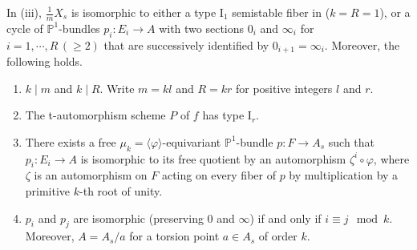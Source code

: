 \documentclass[reqno, letterpaper]{amsart}
\numberwithin{equation}{subsection}
\let\to\longrightarrow
\newcommand{\PP}{\mathbb{P}}
\begin{document}
		\begin{theorem}  \label{thm:classification of multiple fiber iii}
			In (iii), $\frac{1}{m}X_s$ is isomorphic to either a type $\mathrm I_1$ semistable fiber in  ($k = R = 1$), or a cycle of $\PP^1$-bundles $p_i : E_i \to A$ with two sections $0_i$ and $\infty_i$ for $i = 1, \cdots, R \, (\ge 2)$ that are successively identified by $0_{i+1} = \infty_i$. Moreover, the following holds.
			\begin{enumerate}
				\item $k \mid m$ and $k \mid R$. Write $m = kl$ and $R = kr$ for positive integers $l$ and $r$.
				\item The t-automorphism scheme $P$ of $f$ has type $\mathrm I_r$.
				\item There exists a free $\mu_k = \langle \varphi \rangle$-equivariant $\PP^1$-bundle $p : F \to A_s$ such that $p_i : E_i \to A$ is isomorphic to its free quotient by an automorphism $\zeta^i \circ \varphi$, where $\zeta$ is an automorphism on $F$ acting on every fiber of $p$ by multiplication by a primitive $k$-th root of unity.
				\item $p_i$ and $p_j$ are isomorphic (preserving $0$ and $\infty$) if and only if $i \equiv j \mod k$. Moreover, $A = A_s / a$ for a torsion point $a \in A_s$ of order $k$.
			\end{enumerate}
		\end{theorem}
		
\end{document}
